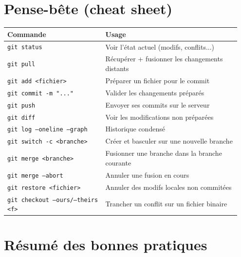 \documentclass[11pt,a4paper]{article}
\begin{document}
\section{Pense-bête (cheat sheet)}

\begin{center}
\renewcommand{\arraystretch}{1.3}
\begin{tabular}{@{}p{0.40\linewidth}p{0.55\linewidth}@{}}
\toprule
\textbf{Commande} & \textbf{Usage} \\
\midrule
\texttt{git status} & Voir l'état actuel (modifs, conflits...) \\
\texttt{git pull} & Récupérer + fusionner les changements distants \\
\texttt{git add <fichier>} & Préparer un fichier pour le commit \\
\texttt{git commit -m "..."} & Valider les changements préparés \\
\texttt{git push} & Envoyer ses commits sur le serveur \\
\texttt{git diff} & Voir les modifications non préparées \\
\texttt{git log --oneline --graph} & Historique condensé \\
\texttt{git switch -c <branche>} & Créer et basculer sur une nouvelle branche \\
\texttt{git merge <branche>} & Fusionner une branche dans la branche courante \\
\texttt{git merge --abort} & Annuler une fusion en cours \\
\texttt{git restore <fichier>} & Annuler des modifs locales non commitées \\
\texttt{git checkout --ours/--theirs <f>} & Trancher un conflit sur un fichier binaire \\
\bottomrule
\end{tabular}
\end{center}

\section{Résumé des bonnes pratiques}
\end{document}
